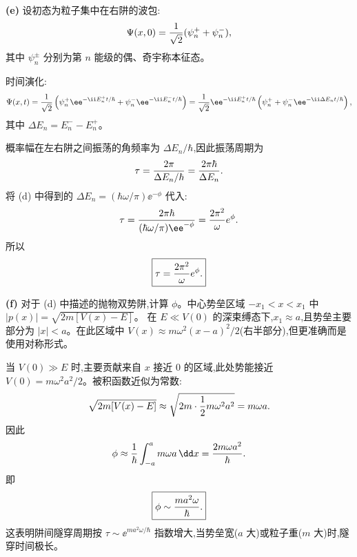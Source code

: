 \begin{question}
\begin{solution}
\textbf{(e)} 设初态为粒子集中在右阱的波包:
\[
\Psi(x,0)={1\over\sqrt2}(\psi_n^++\psi_n^-),
\]
其中 $\psi_n^\pm$ 分别为第 $n$ 能级的偶、奇宇称本征态。

时间演化:
\[
\Psi(x,t)={1\over\sqrt2}\left(
\psi_n^+ \ee^{-\ii E_n^+ t/\hbar}
+\psi_n^- \ee^{-\ii E_n^- t/\hbar}
\right)
={1\over\sqrt2}\ee^{-\ii E_n^+ t/\hbar}\left(
\psi_n^+ +\psi_n^- \ee^{-\ii\Delta E_n t/\hbar}
\right),
\]
其中 $\Delta E_n=E_n^--E_n^+$。

概率幅在左右阱之间振荡的角频率为 $\Delta E_n/\hbar$,因此振荡周期为
\[
\tau={2\pi\over\Delta E_n/\hbar}={2\pi\hbar\over\Delta E_n}.
\]
将 (d) 中得到的 $\Delta E_n=(\hbar\omega/\pi)\ee^{-\phi}$ 代入:
\[
\tau={2\pi\hbar\over(\hbar\omega/\pi)\ee^{-\phi}}
={2\pi^2\over\omega}e^\phi.
\]
所以
\[
\boxed{\tau={2\pi^2\over\omega}e^\phi.}
\]

\textbf{(f)} 对于 (d) 中描述的抛物双势阱,计算 $\phi$。中心势垒区域 $-x_1<x<x_1$ 中 $|p(x)|=\sqrt{2m[V(x)-E]}$。
在 $E\ll V(0)$ 的深束缚态下,$x_1\approx a$,且势垒主要部分为 $|x|<a$。在此区域中 $V(x)\approx m\omega^2(x-a)^2/2$(右半部分),但更准确而是使用对称形式。

当 $V(0)\gg E$ 时,主要贡献来自 $x$ 接近 $0$ 的区域,此处势能接近 $V(0)=m\omega^2a^2/2$。被积函数近似为常数:
\[
\sqrt{2m[V(x)-E]}\approx\sqrt{2m\cdot{1\over2}m\omega^2a^2}=m\omega a.
\]
因此
\[
\phi\approx{1\over\hbar}\int_{-a}^{a}m\omega a\,\dd x
={2m\omega a^2\over\hbar}.
\]
即
\[
\boxed{\phi\sim{ma^2\omega\over\hbar}.}
\]
这表明阱间隧穿周期按 $\tau\sim \ee^{ma^2\omega/\hbar}$ 指数增大,当势垒宽($a$ 大)或粒子重($m$ 大)时,隧穿时间极长。
\end{solution}
\end{question}

